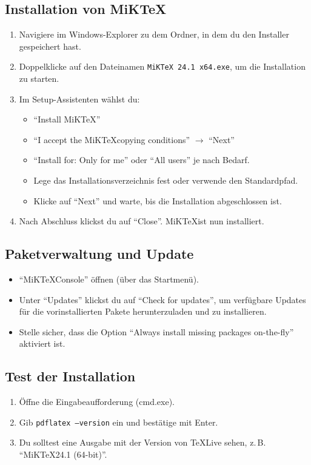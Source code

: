\subsection{Installation von MiK\TeX}
\begin{enumerate}
    \item Navigiere im Windows-Explorer zu dem Ordner, in dem du den Installer gespeichert hast.
    \item Doppelklicke auf den Dateinamen \texttt{MiKTeX 24.1 x64.exe}, um die Installation zu starten.
    \item Im Setup-Assistenten wählst du:
    \begin{itemize}
        \item \enquote{Install MiK\TeX}
        \item \enquote{I accept the MiK\TeX copying conditions} $\rightarrow$ \enquote{Next}
        \item \enquote{Install for: Only for me} oder \enquote{All users} je nach Bedarf.
        \item Lege das Installationsverzeichnis fest oder verwende den Standardpfad.
        \item Klicke auf \enquote{Next} und warte, bis die Installation abgeschlossen ist.
    \end{itemize}
    \item Nach Abschluss klickst du auf \enquote{Close}. MiK\TeX ist nun installiert.
\end{enumerate}

\subsection{Paketverwaltung und Update}
\begin{itemize}
    \item \enquote{MiK\TeX Console} öffnen (über das Startmenü).
    \item Unter \enquote{Updates} klickst du auf \enquote{Check for updates}, um verfügbare Updates für die vorinstallierten Pakete herunterzuladen und zu installieren.
    \item Stelle sicher, dass die Option \enquote{Always install missing packages on-the-fly} aktiviert ist.
\end{itemize}

\subsection{Test der Installation}
\begin{enumerate}
    \item Öffne die Eingabeaufforderung (cmd.exe).
    \item Gib \texttt{pdflatex --version} ein und bestätige mit Enter.
    \item Du solltest eine Ausgabe mit der Version von \TeX Live sehen, z.\,B. \enquote{MiK\TeX 24.1 (64-bit)}.
\end{enumerate}

